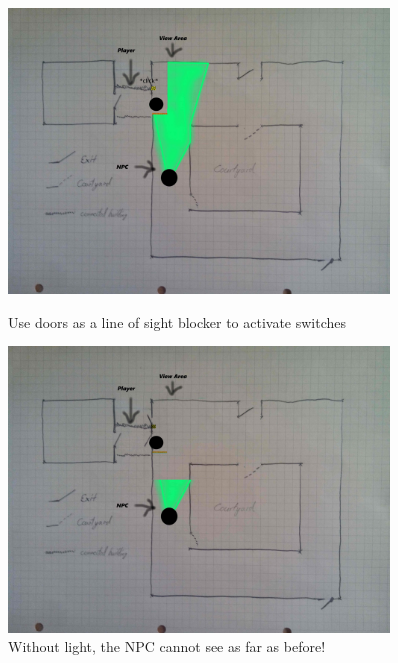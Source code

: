 \documentclass[12pt]{article}
\begin{document}
 \begin{figure}
       	\centering
       	\begin{minipage}{0.45\textwidth}
       		\centering
       		\includegraphics[width=0.9\textwidth]{Images/notgotcaught} %
       		\caption{Use doors as a line of sight blocker to activate switches}
       	\end{minipage}\hfill
       	\begin{minipage}{0.45\textwidth}
       		\centering
       		\includegraphics[width=0.9\textwidth]{Images/lightsofflineofsight} %
       		\caption{Without light, the NPC cannot see as far as before!}
      	\end{minipage}
 \end{figure}
\end{document}
